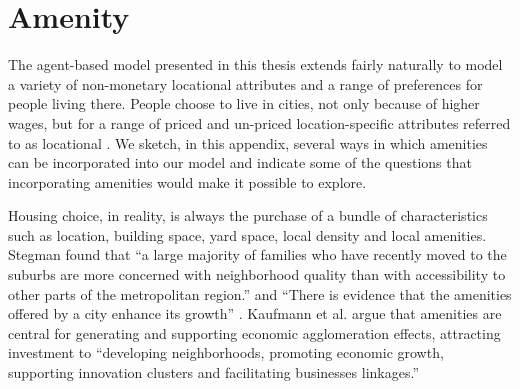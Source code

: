 \chapter{Amenity}\label{chapter-amenity}

The agent-based model presented in this thesis extends fairly naturally to model a variety of non-monetary locational attributes and a range of preferences for people living there. People choose to live in cities, not only because of higher wages, but for a range of priced and un-priced location-specific attributes referred to as locational .  We sketch, in this appendix, several ways in which amenities can be incorporated into our model and indicate some of the questions that incorporating amenities would make it possible to explore.

Housing choice, in reality, is always the purchase of a bundle of characteristics such as location, building space, yard space, local density and local amenities. %
Stegman \cite{stegmanAccessibilityModelsResidential1969a} found that ``a large majority of families who have recently moved to the suburbs are more concerned with neighborhood quality than with accessibility to other parts of the metropolitan region.''  and ``There is evidence that the amenities offered by a city enhance its growth'' \cite{clarkAmenitiesDriveUrban2002, falckPhantomOperaCultural2011}. 
Kaufmann et al. \cite{kaufmannScalingUrbanAmenities2022} 
argue that amenities are central for generating and supporting economic agglomeration effects, attracting investment to ``developing neighborhoods, promoting economic growth, supporting innovation clusters and facilitating businesses linkages.''


